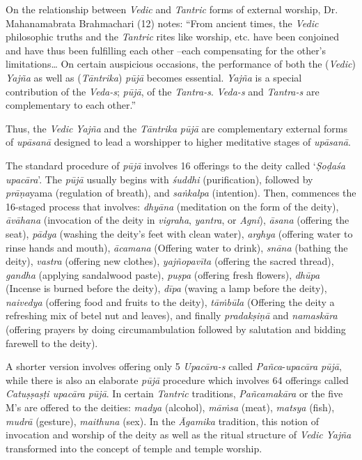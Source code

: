 On the relationship between \emph{Vedic} and \emph{Tantric} forms of external worship, Dr. Mahanamabrata Brahmachari (12) notes: ``From ancient times, the \emph{Vedic} philosophic truths and the \emph{Tantric} rites like worship, etc. have been conjoined and have thus been fulfilling each other --each compensating for the other's limitations\ldots{} On certain auspicious occasions, the performance of both the (\emph{Vedic}) \emph{Yajña} as well as (\emph{Tāntrika}) \emph{pūjā} becomes essential. \emph{Yajña} is a special contribution of the \emph{Veda-s}; \emph{pūjā}, of the \emph{Tantra-s}. \emph{Veda-s} and \emph{Tantra-s} are complementary to each other.''

Thus, the \emph{Vedic} \emph{Yajña} and the \emph{Tāntrika} \emph{pūjā} are complementary external forms of \emph{upāsanā} designed to lead a worshipper to higher meditative stages of \emph{upāsanā}.

The standard procedure of \emph{pūjā} involves 16 offerings to the deity called `\emph{Ṣoḍaśa} \emph{upacāra}'. The \emph{pūjā} usually begins with \emph{śuddhi} (purification), followed by \emph{prāṇa}yama (regulation of breath), and \emph{saṅkalpa} (intention). Then, commences the 16-staged process that involves: \emph{dhyāna} (meditation on the form of the deity), \emph{āvāhana} (invocation of the deity in \emph{vigraha}, \emph{yantra}, or \emph{Agni}), \emph{āsana} (offering the seat), \emph{pādya} (washing the deity's feet with clean water), \emph{arghya} (offering water to rinse hands and mouth), \emph{ācamana} (Offering water to drink), \emph{snāna} (bathing the deity), \emph{vastra} (offering new clothes), \emph{yajñopavīta} (offering the sacred thread), \emph{gandha} (applying sandalwood paste), \emph{puṣpa} (offering fresh flowers), \emph{dhūpa} (Incense is burned before the deity), \emph{dīpa} (waving a lamp before the deity), \emph{naivedya} (offering food and fruits to the deity), \emph{tāṁbūla} (Offering the deity a refreshing mix of betel nut and leaves), and finally \emph{pradakṣiṇā} and \emph{namaskāra} (offering prayers by doing circumambulation followed by salutation and bidding farewell to the deity).

A shorter version involves offering only 5 \emph{Upacāra-s} called \emph{Pañca}-\emph{upacāra} \emph{pūjā}, while there is also an elaborate \emph{pūjā} procedure which involves 64 offerings called \emph{Catuṣṣaṣṭi upacāra} \emph{pūjā}. In certain \emph{Tantric} traditions, \emph{Pañcamakāra} or the five M's are offered to the deities: \emph{madya} (alcohol), \emph{māṁsa} (meat), \emph{matsya} (fish), \emph{mudrā} (gesture), \emph{maithuna} (sex). In the \emph{Āgamika} tradition, this notion of invocation and worship of the deity as well as the ritual structure of \emph{Vedic} \emph{Yajña} transformed into the concept of temple and temple worship.

